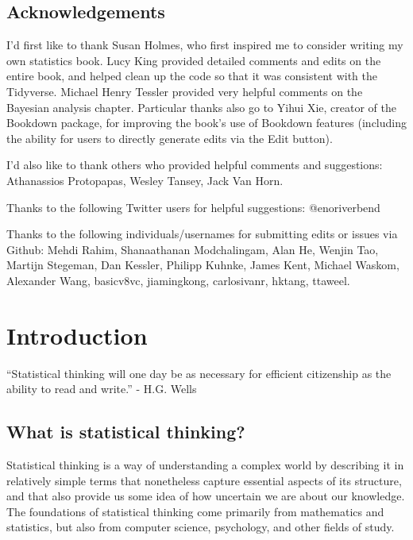 \documentclass[]{book}
\theoremstyle{definition}
\theoremstyle{definition}
\theoremstyle{definition}
\theoremstyle{remark}
\begin{document}
\section{Acknowledgements}\label{acknowledgements}

I'd first like to thank Susan Holmes, who first inspired me to consider
writing my own statistics book. Lucy King provided detailed comments and
edits on the entire book, and helped clean up the code so that it was
consistent with the Tidyverse. Michael Henry Tessler provided very
helpful comments on the Bayesian analysis chapter. Particular thanks
also go to Yihui Xie, creator of the Bookdown package, for improving the
book's use of Bookdown features (including the ability for users to
directly generate edits via the Edit button).

I'd also like to thank others who provided helpful comments and
suggestions: Athanassios Protopapas, Wesley Tansey, Jack Van Horn.

Thanks to the following Twitter users for helpful suggestions:
@enoriverbend

Thanks to the following individuals/usernames for submitting edits or
issues via Github: Mehdi Rahim, Shanaathanan Modchalingam, Alan He,
Wenjin Tao, Martijn Stegeman, Dan Kessler, Philipp Kuhnke, James Kent,
Michael Waskom, Alexander Wang, basicv8vc, jiamingkong, carlosivanr,
hktang, ttaweel.

\chapter{Introduction}\label{introduction}

``Statistical thinking will one day be as necessary for efficient
citizenship as the ability to read and write.'' - H.G. Wells

\section{What is statistical
thinking?}\label{what-is-statistical-thinking}

Statistical thinking is a way of understanding a complex world by
describing it in relatively simple terms that nonetheless capture
essential aspects of its structure, and that also provide us some idea
of how uncertain we are about our knowledge. The foundations of
statistical thinking come primarily from mathematics and statistics, but
also from computer science, psychology, and other fields of study.
\end{document}
